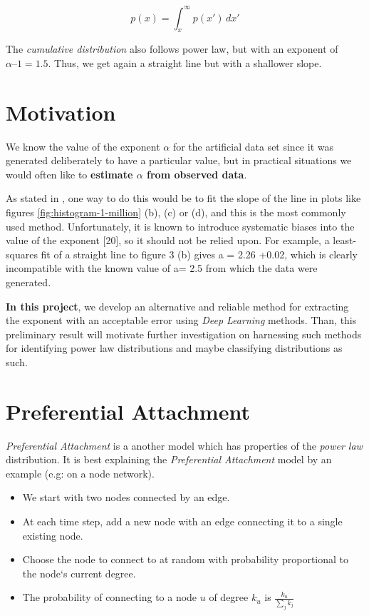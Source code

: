\documentclass[a4paper, 12pt]{report}
\begin{document}
\begin{equation}
\label{eq:cumsum}
p(x) = \int_{x}^{\infty} p(x')\, dx'
\end{equation}

The \textit{cumulative distribution} also follows power law, but with an exponent of $\alpha – 1 = 1.5$. Thus, we get again a straight line but with a shallower slope.

\section{Motivation}
We know the value of the exponent $\alpha$ for the artificial data set since it was generated deliberately to have a particular value, but in practical situations we would often like to \textbf{estimate $\alpha$ from observed data}.

As stated in \cite{newman}, one way to do this would be to fit the slope of the line in plots like figures \ref{fig:histogram-1-million} (b), (c) or (d), and this is the most commonly used method.
Unfortunately, it is known to introduce systematic biases into the value of the exponent [20], so it should not be relied upon. For example, a least-squares fit of a straight line to
figure 3 (b) gives a = 2.26 +0.02, which is clearly incompatible with the known value of a= 2.5 from which the data were generated.

\textbf{In this project}, we develop an alternative and reliable method for extracting the exponent with an acceptable error using \textit{Deep Learning} methods. Than, this preliminary result will motivate further investigation on harnessing such methods for identifying power law distributions and maybe classifying distributions as such.

\pagebreak
\section{Preferential Attachment}
\textit{Preferential Attachment} is a another model which has properties of the \textit{power law} distribution. It is best explaining the \textit{Preferential Attachment} model by an example (e.g: on a node network).
\begin{itemize}
  \item We start with two nodes connected by an edge.
  \item At each time step, add a new node with an edge connecting it to a single existing node. 
  \item Choose the node to connect to at random with probability proportional to the node`s current degree.
  \item The probability of connecting to a node $u$ of degree $k_u$ is $\frac{k_u}{\sum_j{k_j}}$
\end{itemize}
\end{document}
